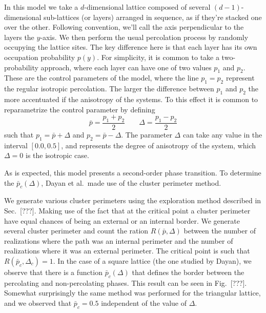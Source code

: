 In this model we take a $d$-dimensional lattice composed of several
$(d-1)$-dimensional sub-lattices (or layers) arranged in sequence, as if
they're stacked one over the other. Following convention, we'll call the axis
perpendicular to the layers the $y$-axis. We then perform the usual percolation
process by randomly occupying the lattice sites. The key difference here is
that each layer has its own occupation probability $p(y)$.
For simplicity, it is common to take a two-probability approach, where
each layer can have one of two values $p_1$ and $p_2$. These are
the control parameters of the model, where the line $p_1=p_2$ represent
the regular isotropic percolation. The larger the difference between
$p_1$ and $p_2$ the more accentuated if the anisotropy of the systems.
To this effect it is common to reparametrize the control parameter
by defining
\begin{equation}
    \bar{p}=\frac{p_1 + p_2}{2}\;\;\;\;\;\;\;\Delta=\frac{p_1 - p_2}{2}
\end{equation}
such that $p_1 = \bar{p} + \Delta$ and $p_2 = \bar{p} - \Delta$. 
The parameter $\Delta$ can take any value in the interval $[0.0,0.5]$,
and represents the degree of anisotropy of the system, which $\Delta=0$
is the isotropic case. 

As is expected, this model presents a second-order phase transition.
To determine the $\bar{p}_c(\Delta)$, Dayan et al.\ made use of the
cluster perimeter method.

We generate various cluster perimeters using the exploration method described
in Sec.~[???]. Making use of the fact that at the critical point a cluster
perimeter have equal chances of being an external or an internal border. We
generate several cluster perimeter and count the ration $R(\bar{p}, \Delta)$
between the number of realizations where the path was an internal perimeter and
the number of realizations where it was an external perimeter. The critical
point is such that $R(\bar{p}_c, \Delta_c)=1$. In the case of a square lattice
(the one studied by Dayan), we observe that there is a function
$\bar{p}_c(\Delta)$ that defines the border between the percolating and
non-percolating phases. This result can be seen in Fig.~[???]. Somewhat
surprisingly the same method was performed for the triangular lattice, and we
observed that $\bar{p}_c=0.5$ independent of the value of $\Delta$.

